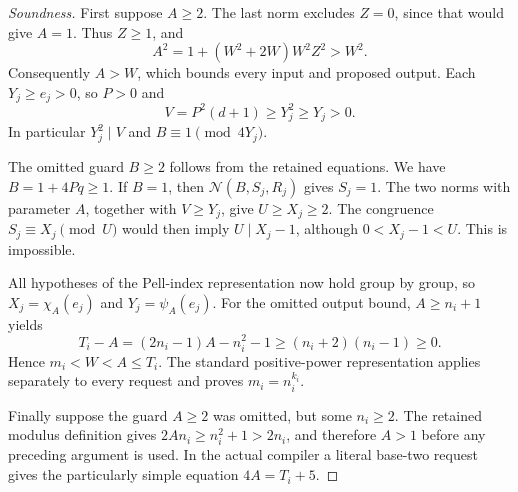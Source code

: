\begin{proof}[Soundness]
First suppose $A\geq2$. The last norm excludes $Z=0$, since that would
give $A=1$. Thus $Z\geq1$, and
\[
 A^2=1+(W^2+2W)W^2Z^2>W^2.
\]
Consequently $A>W$, which bounds every input and proposed output. Each
$Y_j\geq e_j>0$, so $P>0$ and
\[
 V=P^2(d+1)\geq Y_j^2\geq Y_j>0.
\]
In particular $Y_j^2\mid V$ and $B\equiv1\pmod{4Y_j}$.

The omitted guard $B\geq2$ follows from the retained equations. We have
$B=1+4Pq\geq1$. If $B=1$, then $\mathcal N(B,S_j,R_j)$ gives $S_j=1$.
The two norms with parameter $A$, together with $V\geq Y_j$, give
$U\geq X_j\geq2$. The congruence $S_j\equiv X_j\pmod U$ would then
imply $U\mid X_j-1$, although $0<X_j-1<U$. This is impossible.

All hypotheses of the Pell-index representation now hold group by group,
so $X_j=\chi_A(e_j)$ and $Y_j=\psi_A(e_j)$. For the omitted output bound,
$A\geq n_i+1$ yields
\[
 T_i-A=(2n_i-1)A-n_i^2-1
       \geq(n_i+2)(n_i-1)\geq0.
\]
Hence $m_i<W<A\leq T_i$. The standard positive-power representation
applies separately to every request and proves $m_i=n_i^{k_i}$.

Finally suppose the guard $A\geq2$ was omitted, but some $n_i\geq2$.
The retained modulus definition gives
$2An_i\geq n_i^2+1>2n_i$, and therefore $A>1$ before any preceding
argument is used. In the actual compiler a literal base-two request gives
the particularly simple equation $4A=T_i+5$.
\end{proof}

